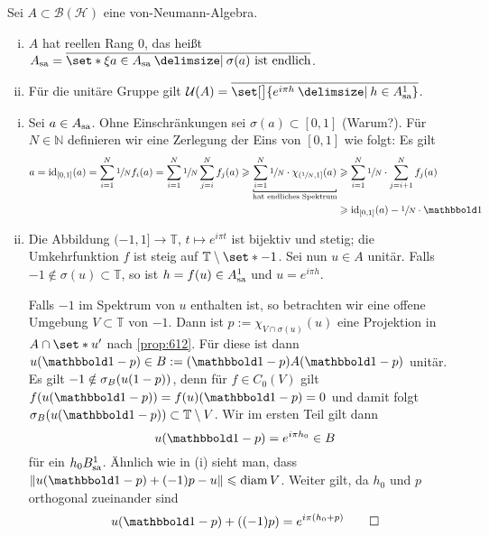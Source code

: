 \begin{korollar}[label=korr:613]
	Sei $A \subset \mathcal{B}(\mathcal{H})$ eine von-Neumann-Algebra.
	\begin{enumerate}[(i)]
		\item $A$ hat reellen Rang $0$, das heißt $A_\sa=\overline{\set*{\xi a \in A_\sa \given \sigma(a) \text{ ist endlich}}}$.
		\item Für die unitäre Gruppe gilt $\mathcal{U}(A)= \overline{\set[\big]{e^{i \pi h} \given h \in A_\sa^1}}$.
	\end{enumerate}
\end{korollar}
\begin{beweis}
	\leavevmode
	\begin{enumerate}[(i)]
		\item Sei $a \in A_{\mathrm{sa}}$. Ohne Einschränkungen sei $\sigma(a) \subset [0,1]$ (Warum?).
		Für $N \in \mathbb{N}$ definieren wir eine Zerlegung der Eins von $[0,1]$ wie folgt:
		Es gilt 
		\begin{align}
			a=\id_{[0,1]}(a)= \sum_{i=1}^N \sfrac{1}{N} f_i(a) = \sum_{i=1}^{N} \sfrac{1}{N} \sum_{j=i}^{N} f_j(a) \ge \Underbracket{\sum_{i=1}^{N} \sfrac{1}{N} \cdot \chi_{(\sfrac{1}{N},1]}(a)}{\text{hat endliches Spektrum}} &\ge \sum_{i=1}^{N} \sfrac{1}{N} \cdot \sum_{j=i+1}^{N} f_j(a) \\
			&\ge \id_{[0,1]}(a) - \sfrac{1}{N} \cdot \ind 
		\end{align}
		\item Die Abbildung $(-1,1] \to \mathbb{T}$, $t \mapsto e^{i \pi t}$ ist bijektiv und stetig; die Umkehrfunktion $f$ ist steig auf $\mathbb{T} \setminus \set*{-1}$.
		Sei nun $u \in A$ unitär. 
		Falls $-1 \notin \sigma(u) \subset \mathbb{T}$, so ist $h=f(u) \in A_{\mathrm{sa}}^1$ und $u=e^{i \pi h}$.
		
		Falls $-1$ im Spektrum von $u$ enthalten ist, so betrachten wir eine offene Umgebung $V \subset \mathbb{T}$ von $-1$.
		Dann ist $p:= \chi_{V\cap \sigma(u)}(u)$ eine Projektion in $A \cap \set*{u}'$ nach \autoref{prop:612}.
		Für diese ist dann $u(\ind-p) \in B := (\ind-p)A(\ind-p)$ unitär.
		Es gilt $-1 \notin \sigma_B \enbrace*{u(1-p)}$, denn für $f \in C_0(V)$ gilt $f \enbrace*{u(\ind-p)}= f(u)(\ind-p)=0$ und damit folgt $\sigma_B \enbrace*{u(\ind-p)} \subset \mathbb{T}\setminus V$.
		Wir im ersten Teil gilt dann
		\[
			u(\ind-p)= e^{i \pi h_0} \in B
		\]
		für ein $h_0 B_{\mathrm{sa}}^1$. 
		Ähnlich wie in (i) sieht man, dass 
		\(
			\norm*{u(\ind-p) +(-1)p -u} \le \diam V
		\).
		Weiter gilt, da $h_0$ und $p$ orthogonal zueinander sind
		\[
			u(\ind-p)+ \enbrace*{(-1) p} = e^{i \pi(h_0+p)} \qedhere
		\]
	\end{enumerate}
\end{beweis}


